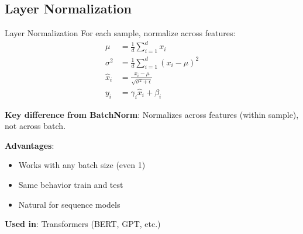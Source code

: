 \subsection{Layer Normalization}

\begin{mathresult}{Layer Normalization}
For each sample, normalize across features:
\begin{align}
\mu &= \frac{1}{d}\sum_{i=1}^d x_i \\
\sigma^2 &= \frac{1}{d}\sum_{i=1}^d (x_i - \mu)^2 \\
\hat{x}_i &= \frac{x_i - \mu}{\sqrt{\sigma^2 + \epsilon}} \\
y_i &= \gamma_i \hat{x}_i + \beta_i
\end{align}
\end{mathresult}

\textbf{Key difference from BatchNorm}: Normalizes across features (within sample), not across batch.

\textbf{Advantages}:
\begin{itemize}
    \item Works with any batch size (even 1)
    \item Same behavior train and test
    \item Natural for sequence models
\end{itemize}

\textbf{Used in}: Transformers (BERT, GPT, etc.)


